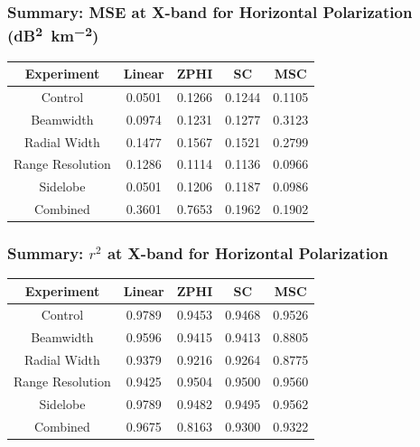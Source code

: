 \documentclass[red]{beamer}
\begin{document}
\begin{frame}
    \frametitle{Summary: MSE at X-band for Horizontal Polarization (\si{dB\squared\per \kilo\meter\squared})}
    \begin{center}
        \begin{tabular}{| c | c | c | c | c |}
            \hline
            Experiment & Linear & ZPHI & SC & MSC \\
            \hline
            \hline
            Control & 0.0501 & 0.1266 & 0.1244 & 0.1105 \\
            Beamwidth & 0.0974 & 0.1231 & 0.1277 & 0.3123 \\
            Radial Width & 0.1477 & 0.1567 & 0.1521 & 0.2799 \\
            Range Resolution & 0.1286 & 0.1114 & 0.1136 & 0.0966 \\
            Sidelobe & 0.0501 & 0.1206 & 0.1187 & 0.0986 \\
            Combined & 0.3601 & 0.7653 & 0.1962 & 0.1902 \\
            \hline
        \end{tabular}
    \end{center}
\end{frame}

\begin{frame}
    \frametitle{Summary: $r^2$ at X-band for Horizontal Polarization}
    \begin{center}
        \begin{tabular}{| c | c | c | c | c |}
            \hline
            Experiment & Linear & ZPHI & SC & MSC \\
            \hline
            \hline
            Control & 0.9789 & 0.9453 & 0.9468 & 0.9526 \\
            Beamwidth & 0.9596 & 0.9415 & 0.9413 & 0.8805 \\
            Radial Width & 0.9379 & 0.9216 & 0.9264 & 0.8775 \\
            Range Resolution & 0.9425 & 0.9504 & 0.9500 & 0.9560 \\
            Sidelobe & 0.9789 & 0.9482 & 0.9495 & 0.9562 \\
            Combined & 0.9675 & 0.8163 & 0.9300 & 0.9322 \\
            \hline
        \end{tabular}
    \end{center}
\end{frame}
\end{document}
